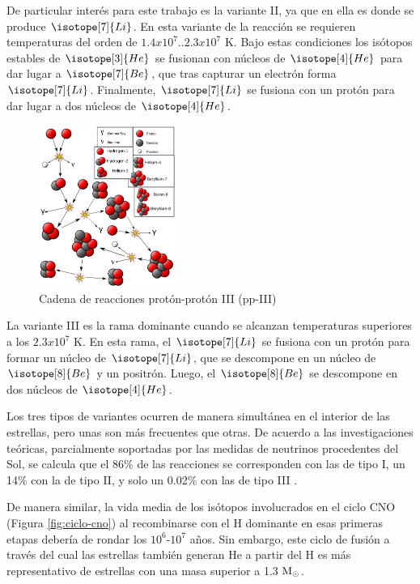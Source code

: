 De particular interés para este trabajo es la variante II, ya que en ella es donde se produce $\isotope[7]{Li}$. En esta variante de la reacción se requieren temperaturas del orden de $1.4x10^7..2.3x10^7$ K. Bajo estas condiciones los isótopos estables de $\isotope[3]{He}$ se fusionan con núcleos de $\isotope[4]{He}$ para dar lugar a $\isotope[7]{Be}$, que tras capturar un electrón forma $\isotope[7]{Li}$. Finalmente, $\isotope[7]{Li}$ se fusiona con un protón para dar lugar a dos núcleos de $\isotope[4]{He}$.\par

\begin{figure}
	\centering
	\includegraphics[width=0.4\textwidth]{img/tesis/pp-III.png}
	\caption {Cadena de reacciones protón-protón III (pp-III)}
	\label{fig:pp-III}
\end{figure}

La variante III es la rama dominante cuando se alcanzan temperaturas superiores a los $2.3x10^7$ K. En esta rama, el $\isotope[7]{Li}$ se fusiona con un protón para formar un núcleo de $\isotope[7]{Li}$, que se descompone en un núcleo de $\isotope[8]{Be}$ y un positrón. Luego, el $\isotope[8]{Be}$ se descompone en dos núcleos de $\isotope[4]{He}$.\par

Los tres tipos de variantes ocurren de manera simultánea en el interior de las estrellas, pero unas son más frecuentes que otras. De acuerdo a las investigaciones teóricas, parcialmente soportadas por las medidas de neutrinos procedentes del Sol, se calcula que el 86\% de las reacciones se corresponden con las de tipo I, un 14\% con la de tipo II, y solo un 0.02\% con las de tipo III \cite{Scholz2018}.


De manera similar, la vida media de los isótopos involucrados en el ciclo CNO (Figura \ref{fig:ciclo-cno}) al recombinarse con el H dominante en esas primeras etapas debería de rondar los $10^6$-$10^7$ años. Sin embargo, este ciclo de fusión a través del cual las estrellas también generan He a partir del H es más representativo de estrellas con una masa superior a 1.3 $\mathrm{M}_\odot$. 


